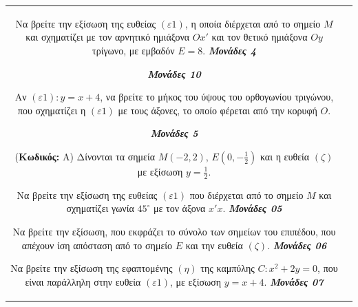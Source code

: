 \documentclass[11pt,a4paper,twoside]{book}
\newcounter{askhsh}[chapter]
\renewcommand{\theaskhsh}{
	\bf{\titlefont{\Large{\thechapter}}.\arabic{askhsh}}
}
\newcommand{\Askhsh}[2]{\refstepcounter{askhsh}{\vspace{4mm}\titlefont{{\large Άσκηση}\theaskhsh} - \textcolor{maincolor}{ΘEMA #2}} ({\small{\textbf{Κωδικός:} #1}})}{}
\newcommand{\monades}[1]{
\hspace*{\fill}
\textbf{\textit{\textcolor{maincolor}{Μονάδες #1}}}}
\begin{document}
\begin{tabular}{cc}
\begin{alist}
\begin{rlist}
        \item Να βρείτε την εξίσωση της ευθείας $(\varepsilon1)$, η οποία διέρχεται από το σημείο $M$ και σχηματίζει με τον αρνητικό ημιάξονα $Ox'$ και τον θετικό ημιάξονα $Oy$ τρίγωνο, με εμβαδόν $E = 8$.  \monades{4}
 \monades{10}
    \end{rlist}
    \item Αν $(\varepsilon1): y = x + 4$, να βρείτε το μήκος του ύψους του ορθογωνίου τριγώνου, που σχηματίζει η $(\varepsilon1)$ με τους άξονες, το οποίο φέρεται από την κορυφή $O$.
 \monades{5}\end{alist}

\vspace{4mm}

\Askhsh{A}{4}
Δίνονται τα σημεία $M(-2, 2)$, $E(0, -\frac{1}{2})$ και η ευθεία $(\zeta)$ με εξίσωση $y = \frac{1}{2}$.

\begin{alist}    \item Να βρείτε την εξίσωση της ευθείας $(\varepsilon1)$ που διέρχεται από το σημείο $M$ και σχηματίζει γωνία $45^\circ$ με τον άξονα $x'x$. \monades{05}
    \item Να βρείτε την εξίσωση, που εκφράζει το σύνολο των σημείων του επιπέδου, που απέχουν ίση απόσταση από το σημείο $E$ και την ευθεία $(\zeta)$. \monades{06}
    \item 
    \begin{rlist}
        \item Να βρείτε την εξίσωση της εφαπτομένης $(\eta)$ της καμπύλης $C: x^2 + 2y = 0$, που είναι παράλληλη στην ευθεία $(\varepsilon1)$, με εξίσωση $y = x + 4$. \monades{07}
        

\end{rlist}
\end{alist}
\end{tabular}
\end{document}
